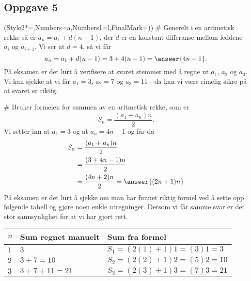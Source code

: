 \subsection*{Oppgave 5}
\begin{easylist}[enumerate]
\ListProperties(Style2*=,Numbers=a,Numbers1=l,FinalMark={)})
# Generelt i en aritmetisk rekke så er $a_n = a_1 + d(n-1)$,
der $d$ er en konstant differanse mellom leddene $a_i$ og $a_{i+1}$.
Vi ser at $d = 4$, så vi får
\begin{equation*}
	a_n = a_1 + d(n-1) =  3 + 4(n-1) = \answer{4n - 1}.
\end{equation*}
På eksamen er det lurt å verifisere at svaret stemmer med å regne ut $a_1$, $a_2$ og $a_3$. 
Vi kan sjekke at vi får $a_1 = 3$, $a_2 = 7$ og $a_3 = 11$---da kan vi være rimelig sikre på at svaret er riktig.

# Bruker formelen for summen av en aritmetisk rekke, som er
\begin{equation*}
	S_n = \frac{(a_1 + a_n) n}{2}.
\end{equation*}
Vi setter inn at $a_1 = 3$ og at $a_n = 4n - 1$ og får da
\begin{align*}
S_n &= \frac{(a_1 + a_n) n}{2} \\
&= \frac{(3  + 4n - 1) n}{2} \\
&= \frac{(4n + 2) n}{2} =  \answer{(2n + 1)n}
\end{align*}
På eksamen er det lurt å sjekke om man har funnet riktig formel ved å sette opp følgende tabell og gjøre noen enkle utregninger.
Dersom vi får samme svar er det stor sannsynlighet for at vi har gjort rett.

\begin{center}
	\begin{tabular}{lll}
		$n$ & Sum regnet manuelt & Sum fra formel \\ \hline
		$1$ & $3$ & $S_1 = (2 (1) + 1)1 = (3)1 = 3$ \\
		$2$ & $3+ 7 = 10$ & $S_2 = (2 (2) + 1)2 = (5)2 = 10$ \\
		$3$ & $3 + 7 + 11 = 21$ & $S_3 = (2 (3) + 1)3 = (7)3 = 21$ \\
	\end{tabular}
\end{center}


\end{easylist}

